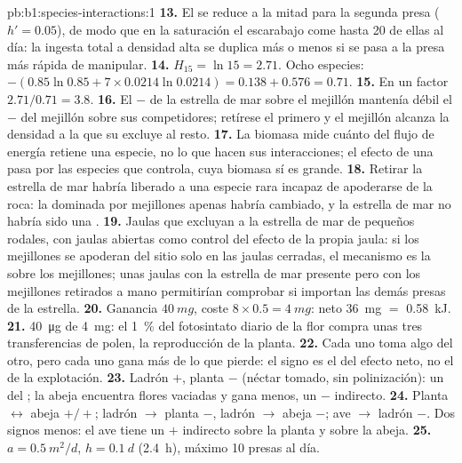 \begin{solution}{pb:b1:species-interactions:1}
\textbf{13.} El  se reduce a la mitad para la segunda
presa ($h' = 0.05$), de modo que en la saturación el escarabajo come hasta
20 de ellas al día: la ingesta total a densidad alta se duplica más o menos
si se pasa a la presa más rápida de manipular.
\textbf{14.} $H_{15} = \ln 15 = 2.71$. Ocho especies: $-(0.85\ln 0.85
+ 7\times 0.0214\ln 0.0214) = 0.138 + 0.576 = 0.71$.
\textbf{15.} En un factor $2.71/0.71 = 3.8$.
\textbf{16.} El $-$ de la estrella de mar sobre el mejillón mantenía débil
el $-$ del mejillón sobre sus competidores; retírese el primero y el
mejillón alcanza la densidad a la que su  excluye al resto.
\textbf{17.} La biomasa mide cuánto del flujo de energía retiene una
especie, no lo que hacen sus interacciones; el efecto de una 
pasa por las especies que controla, cuya biomasa sí es grande.
\textbf{18.} Retirar la estrella de mar habría liberado a una especie rara
incapaz de apoderarse de la roca: la  dominada por mejillones
apenas habría cambiado, y la estrella de mar no habría sido una .
\textbf{19.} Jaulas que excluyan a la estrella de mar de pequeños rodales,
con jaulas abiertas como control del efecto de la propia jaula: si los
mejillones se apoderan del sitio solo en las jaulas cerradas, el mecanismo
es la  sobre los mejillones; unas jaulas con la estrella de mar
presente pero con los mejillones retirados a mano permitirían comprobar si
importan las demás presas de la estrella.
\textbf{20.} Ganancia $\qty{40}{mg}$, coste $8\times 0.5 = \qty{4}{mg}$:
neto \qty{36}{mg} $=$ \qty{0.58}{kJ}.
\textbf{21.} \qty{40}{\micro g} de \qty{4}{mg}: el \qty{1}{\%} del
fotosintato diario de la flor compra unas tres transferencias de polen, la
reproducción de la planta.
\textbf{22.} Cada uno toma algo del otro, pero cada uno gana más de lo que
pierde: el signo es el del efecto neto, no el de la explotación.
\textbf{23.} Ladrón $+$, planta $-$ (néctar tomado, sin polinización): un
 del ; la abeja encuentra flores vaciadas y gana menos,
un $-$ indirecto.
\textbf{24.} Planta $\leftrightarrow$ abeja $+/+$; ladrón $\to$ planta $-$,
ladrón $\to$ abeja $-$; ave $\to$ ladrón $-$. Dos signos menos: el ave
tiene un $+$ indirecto sobre la planta y sobre la abeja.
\textbf{25.} $a = \qty{0.5}{m^2/d}$, $h = \qty{0.1}{d}$ (\qty{2.4}{h}),
máximo \num{10} presas al día.
\end{solution}
